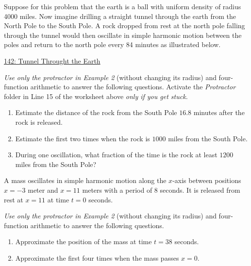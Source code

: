 \documentclass{ximera}
\begin{document}
\begin{example}  \label{Ex:FEfe344trgfd}

Suppose for this problem that the earth is a ball with uniform density of radius 4000 miles. Now imagine drilling a straight tunnel through the earth from the North Pole to the South Pole. A rock dropped from rest at the north pole falling through the tunnel would then oscillate in simple harmonic motion between the poles and return to the north pole every 84  minutes as illustrated below. 

\begin{onlineOnly}
    \begin{center}
\end{center}
\end{onlineOnly}

\href{https://www.desmos.com/calculator/z5ya8iy2e4}{142: Tunnel Throught the Earth }


\emph{Use only the protractor in Example 2} (without changing its radius) and four-function arithmetic to answer the following questions. Activate the \emph{Protractor} folder in Line 15 of the worksheet above \emph{only if you get stuck.} 
\begin{enumerate}
\item Estimate the distance of the rock from the South Pole $16.8$ minutes after the rock is released.

\item Estimate the first two times when the rock is $1000$ miles from the South Pole.

\item During one oscillation, what fraction of the time is the rock at least $1200$ miles from the South Pole?
\end{enumerate}
\end{example}

\begin{example} \label{Ex:8dferGGDEE}
A mass oscillates in simple harmonic motion along the $x$-axis between positions $x=-3$ meter and $x=11$ meters with a period of $8$ seconds. It is released from rest at $x=11$ at time $t=0$ seconds.

\emph{Use only the protractor in Example 2} (without changing its radius) and four-function arithmetic to answer the following questions.

\begin{enumerate}
\item Approximate the position of the mass at time $t=38$ seconds.

\item Approximate the first four times when the mass passes $x=0$.
\end{enumerate}

\end{example}
\end{document}
